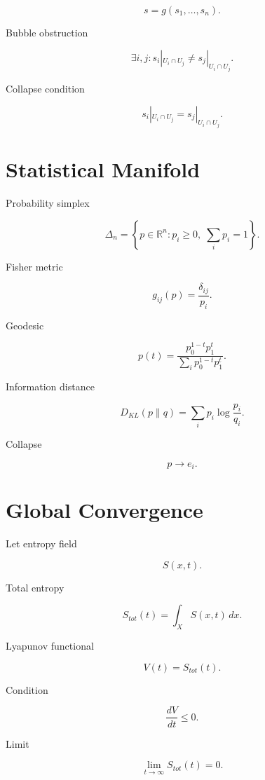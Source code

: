 \documentclass[11pt]{article}
\begin{document}
\[
s = g(s_1,\dots,s_n).
\]

Bubble obstruction

\[
\exists i,j :
s_i|_{U_i \cap U_j}
\neq
s_j|_{U_i \cap U_j}.
\]

Collapse condition

\[
s_i|_{U_i \cap U_j}
=
s_j|_{U_i \cap U_j}.
\]


\section{Statistical Manifold}

Probability simplex

\[
\Delta_n =
\left\{
p \in \mathbb{R}^n :
p_i \ge 0,\;
\sum_i p_i = 1
\right\}.
\]

Fisher metric

\[
g_{ij}(p)
=
\frac{\delta_{ij}}{p_i}.
\]

Geodesic

\[
p(t) =
\frac{p_0^{1-t} p_1^t}
{\sum_i p_0^{1-t} p_1^t}.
\]

Information distance

\[
D_{KL}(p \| q)
=
\sum_i p_i \log \frac{p_i}{q_i}.
\]

Collapse

\[
p \rightarrow e_i.
\]


\section{Global Convergence}

Let entropy field

\[
S(x,t).
\]

Total entropy

\[
S_{tot}(t)
=
\int_X S(x,t)\,dx.
\]

Lyapunov functional

\[
V(t) = S_{tot}(t).
\]

Condition

\[
\frac{dV}{dt} \le 0.
\]

Limit

\[
\lim_{t\to\infty}
S_{tot}(t) = 0.
\]
\end{document}
